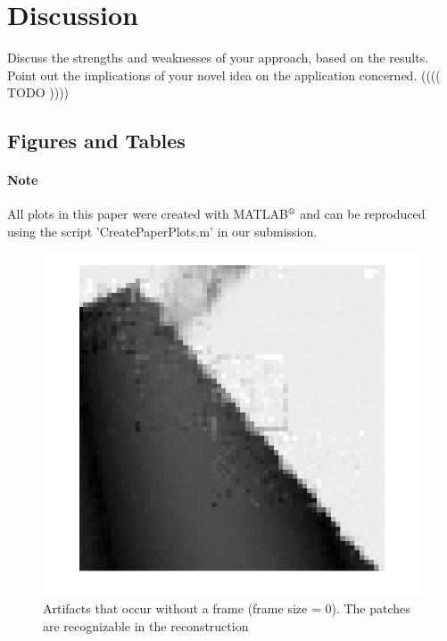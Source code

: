 \documentclass[10pt,conference,compsocconf]{IEEEtran}
\begin{document}
\section{Discussion}
  Discuss the strengths and weaknesses of your
  approach, based on the results. Point out the implications of your  
  novel idea on the application concerned. (((( TODO ))))


\subsection{Figures and Tables}

\paragraph{Note}
All plots in this paper were created with MATLAB$\textsuperscript{\textregistered}$ and can be reproduced using the script 'CreatePaperPlots.m' in our submission.\\

\begin{figure}[tbp]
  \centering
  \includegraphics[width=\columnwidth]{images/boundaryArtifact_noframe.png}
  \caption{Artifacts that occur without a frame (frame size = 0). The patches are recognizable in the reconstruction}
  \label{fig:boundaryArtifacts}
\end{figure}
\end{document}
